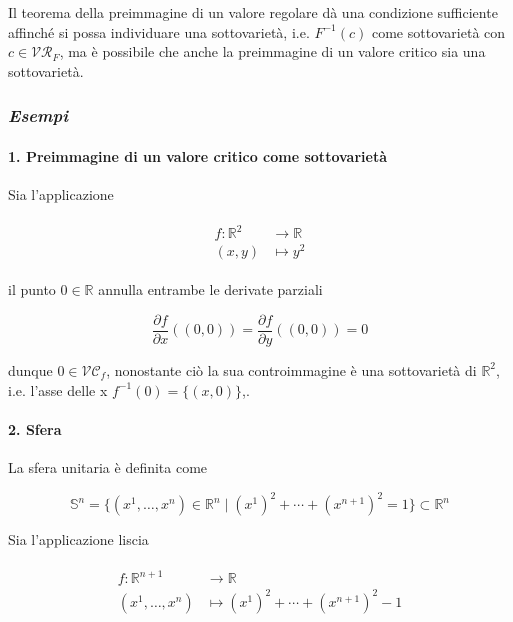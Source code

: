 \begin{remark}
	Il teorema della preimmagine di un valore regolare dà una condizione sufficiente affinché si possa individuare una sottovarietà, i.e. $ F^{-1}(c) $ come sottovarietà con $ c \in \mathcal{VR}_{F} $, ma è possibile che anche la preimmagine di un valore critico sia una sottovarietà.
\end{remark}

\subsubsection{\textit{Esempi}}

\paragraph{1. Preimmagine di un valore critico come sottovarietà}

Sia l'applicazione

\begin{align}
	\begin{split}
		f : \mathbb{R}^{2} &\to \mathbb{R}\\
		(x,y) &\mapsto y^{2}
	\end{split}
\end{align}

il punto $ 0 \in \mathbb{R} $ annulla entrambe le derivate parziali

\begin{equation}
	\dfrac{\partial f}{\partial x} ((0,0)) = \dfrac{\partial f}{\partial y} ((0,0)) = 0
\end{equation}

dunque $ 0 \in \mathcal{VC}_{f} $, nonostante ciò la sua controimmagine è una sottovarietà di $ \mathbb{R}^{2} $, i.e. l'asse delle x $ f^{-1}(0) = \{(x,0)\} $,.

\paragraph{2. Sfera}

La sfera unitaria è definita come

\begin{equation}
	\mathbb{S}^{n} = \{ (x^{1},\dots,x^{n}) \in \mathbb{R}^{n} \mid (x^{1})^{2} + \cdots + (x^{n+1})^{2} = 1 \} \subset \mathbb{R}^{n}
\end{equation}

Sia l'applicazione liscia

\begin{align}
	\begin{split}
		f : \mathbb{R}^{n+1} &\to \mathbb{R}\\
		(x^{1},\dots,x^{n}) &\mapsto (x^{1})^{2} + \cdots + (x^{n+1})^{2} - 1
	\end{split}
\end{align}

